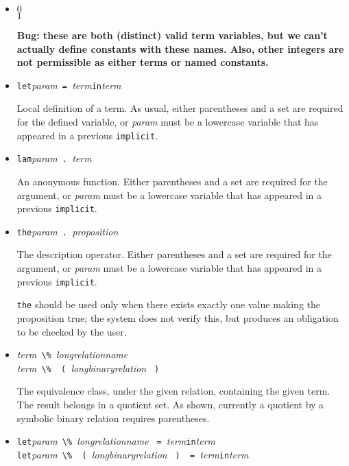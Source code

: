 \documentclass[12pt]{article}
\newcommand{\keywd}[1]{\mbox{\texttt{#1}}\xspace}
\newcommand{\IMPLICIT}{\keywd{implicit}}
\newcommand{\IN}{\keywd{in}}
\newcommand{\LAMBDA}{\keywd{lam}}
\newcommand{\LET}{\keywd{let}}
\newcommand{\THE}{\keywd{the}}
\newcommand{\metav}[1]{\mbox{\textit{#1}}\xspace}
\newcommand{\Label}{\metav{\Verb|`|label}}
\newcommand{\Proposition}{\metav{proposition}}
\newcommand{\Param}{\metav{param}}
\newcommand{\Term}{\metav{term}}
\newcommand{\EQUALS}{\mbox{\Verb| = |}}
\newcommand{\LPAREN}{\mbox{\Verb| ( |}}
\newcommand{\PERCENT}{\mbox{\Verb+ \% +}}
\newcommand{\RPAREN}{\mbox{\Verb| ) |}}
\newcommand{\PERIOD}{\mbox{\Verb| . |}}
\newcommand{\NB}{\textbf{NB: }}
\begin{document}
\begin{itemize}
  \NB A single identifier in a pattern-matching case need not
  be described in an \IMPLICIT; there is enough information from
  looking at the \Term and the \Label.

\item $0$\\
      $1$

  \textbf{Bug: these are both (distinct) valid term variables, but we can't actually
  define constants with these names.  Also, other integers are not permissible
  as either terms or named constants.}

\item \LET \Param \EQUALS \Term \IN \Term
  
  Local definition of a term.  As usual, either parentheses and a set
  are required for the defined variable, or \Param must be a lowercase
  variable that has appeared in a previous \IMPLICIT.

\item \LAMBDA \Param \PERIOD \Term
  
  An anonymous function.  Either parentheses and a set are required
  for the argument, or \Param must be a lowercase variable that has
  appeared in a previous \IMPLICIT.

\item \THE \Param \PERIOD \Proposition

  The description operator.  Either parentheses and a set are required
  for the argument, or \Param must be a lowercase variable that has
  appeared in a previous \IMPLICIT.  

  \THE should be used only when there exists exactly one value making
  the proposition true; the system does not verify this, but produces
  an obligation to be checked by the user.

\item \Term \PERCENT \metav{longrelationname}\\
      \Term \PERCENT \LPAREN \metav{longbinaryrelation} \RPAREN

  The equivalence class, under the given relation, containing the
  given term.  The result belongs in a quotient set.  As shown,
  currently a quotient by a symbolic binary relation requires
  parentheses.

\item \LET \Param \PERCENT \metav{longrelationname} \EQUALS \Term \IN \Term\\
      \LET \Param \PERCENT \LPAREN \metav{longbinaryrelation} \RPAREN \EQUALS \Term \IN \Term\\


\end{itemize}
\end{document}
